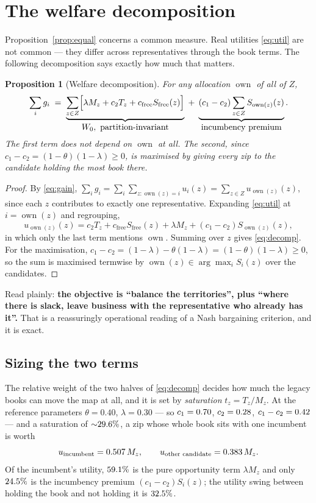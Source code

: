 \documentclass[11pt]{article}
\newtheorem{prop}{Proposition}
\theoremstyle{definition}
\newcommand{\Sfree}{S_{\mathrm{free}}}
\newcommand{\cfree}{c_{\mathrm{free}}}
\newcommand{\owner}{\operatorname{own}}
\begin{document}
\section{The welfare decomposition}\label{sec:decomp}

Proposition~\ref{prop:equal} concerns a common measure. Real utilities \eqref{eq:util} are
not common --- they differ across representatives through the book terms. The following
decomposition says exactly how much that matters.

\begin{prop}[Welfare decomposition]\label{prop:decomp}
For any allocation $\owner$ of all of $Z$,
\begin{equation}\label{eq:decomp}
\sum_i g_i
\;=\;\underbrace{\sum_{z\in Z}\Bigl[\lambda M_z + c_2 T_z + \cfree \Sfree(z)\Bigr]}_{\textstyle W_0,\ \text{partition-invariant}}
\;+\;\underbrace{(c_1-c_2)\sum_{z\in Z} S_{\owner(z)}(z)}_{\textstyle \text{incumbency premium}} .
\end{equation}
The first term does not depend on $\owner$ at all. The second, since $c_1-c_2=(1-\theta)(1-\lambda)\ge0$,
is maximised by giving every zip to the candidate holding the most book there.
\end{prop}

\begin{proof}
By \eqref{eq:gain}, $\sum_i g_i=\sum_i\sum_{z:\owner(z)=i}u_i(z)=\sum_{z\in Z}u_{\owner(z)}(z)$,
since each $z$ contributes to exactly one representative. Expanding \eqref{eq:util} at
$i=\owner(z)$ and regrouping,
\[
u_{\owner(z)}(z)=c_2T_z+\cfree\Sfree(z)+\lambda M_z+(c_1-c_2)S_{\owner(z)}(z),
\]
in which only the last term mentions $\owner$. Summing over $z$ gives \eqref{eq:decomp}.
For the maximisation, $c_1-c_2=(1-\lambda)-\theta(1-\lambda)=(1-\theta)(1-\lambda)\ge0$,
so the sum is maximised termwise by $\owner(z)\in\arg\max_i S_i(z)$ over the candidates.
\end{proof}

Read plainly: \textbf{the objective is ``balance the territories'', plus ``where there is
slack, leave business with the representative who already has it''.} That is a
reassuringly operational reading of a Nash bargaining criterion, and it is exact.

\subsection{Sizing the two terms}

The relative weight of the two halves of \eqref{eq:decomp} decides how much the legacy
books can move the map at all, and it is set by \emph{saturation} $t_z=T_z/M_z$. At the
reference parameters $\theta=0.40$, $\lambda=0.30$ --- so $c_1=0.70$, $c_2=0.28$,
$c_1-c_2=0.42$ --- and a saturation of ${\sim}29.6\%$, a zip whose whole book sits with
one incumbent is worth
\[
u_{\text{incumbent}} = 0.507\,M_z, \qquad u_{\text{other candidate}} = 0.383\,M_z .
\]
Of the incumbent's utility, $59.1\%$ is the pure opportunity term $\lambda M_z$ and
only $24.5\%$ is the incumbency premium $(c_1-c_2)S_i(z)$; the utility swing between
holding the book and not holding it is $32.5\%$.
\end{document}

